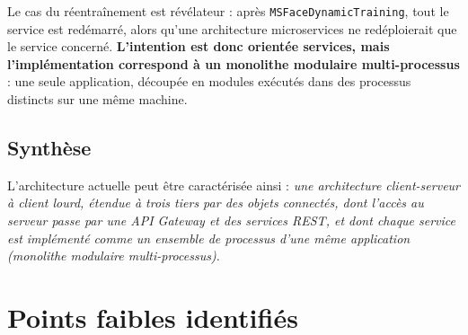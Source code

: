 \documentclass[11pt,a4paper]{report}
\newcommand{\ms}[1]{\texttt{#1}}
\begin{document}
Le cas du réentraînement est révélateur : après \ms{MSFaceDynamicTraining}, tout le service est redémarré, alors qu'une architecture microservices ne redéploierait que le service concerné. \textbf{L'intention est donc orientée services, mais l'implémentation correspond à un monolithe modulaire multi-processus} : une seule application, découpée en modules exécutés dans des processus distincts sur une même machine.

\subsection{Synthèse}
L'architecture actuelle peut être caractérisée ainsi : \emph{une architecture client-serveur à client lourd, étendue à trois tiers par des objets connectés, dont l'accès au serveur passe par une API Gateway et des services REST, et dont chaque service est implémenté comme un ensemble de processus d'une même application (monolithe modulaire multi-processus).}

\section{Points faibles identifiés}
\end{document}
